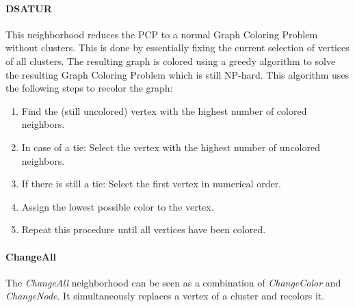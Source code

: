 \documentclass[paper = a4, fontsize = 10pt]{scrartcl}
\begin{document}

\paragraph{DSATUR}
This neighborhood reduces the PCP to a normal Graph Coloring Problem without clusters. This is done by essentially fixing the current selection of vertices of all clusters. The resulting graph is colored using a greedy algorithm to solve the resulting Graph Coloring Problem which is still NP-hard. This algorithm uses the following steps to recolor the graph:


\begin{enumerate}
	 \item Find the (still uncolored) vertex with the highest number of colored neighbors.
	 \item In case of a tie: Select the vertex with the highest number of uncolored neighbors.
	 \item If there is still a tie: Select the first vertex in numerical order.
	 \item Assign the lowest possible color to the vertex.
	 \item Repeat this procedure until all vertices have been colored.
\end{enumerate}

\paragraph{ChangeAll}
The \emph{ChangeAll} neighborhood can be seen as a combination of \emph{ChangeColor} and \emph{ChangeNode}. It simultaneously replaces a vertex of a cluster and recolors it.
\end{document}
